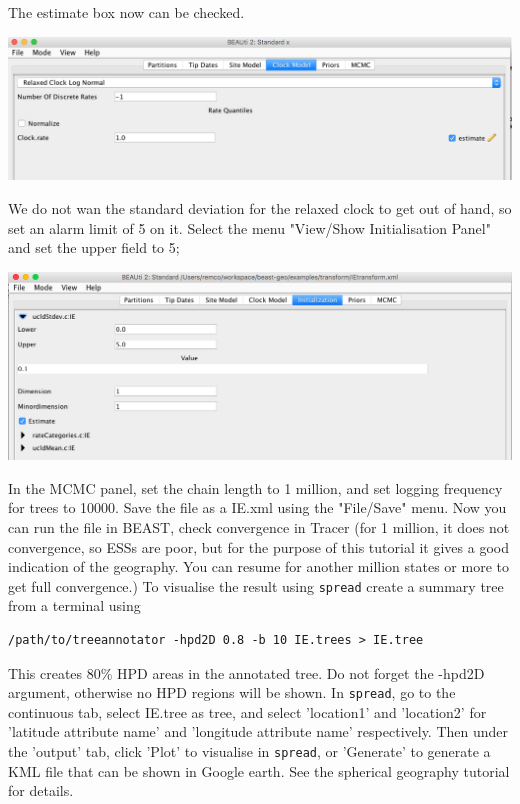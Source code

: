 \documentclass{article}
\begin{document}
The estimate box now can be checked.

\begin{center}
\includegraphics[scale=0.4]{figures/BEAUti_transform6}
\end{center}

We do not wan the standard deviation for the relaxed clock to get out of hand, so set an alarm limit of 5 on it. Select the menu "View/Show Initialisation Panel" and set the upper field to 5;

\begin{center}
\includegraphics[scale=0.4]{figures/BEAUti_transform7} 
\end{center}

In the MCMC panel, set the chain length to 1 million, and set logging frequency for trees to 10000. Save the file as a IE.xml using the "File/Save" menu. Now you can run the file in BEAST, check convergence in Tracer (for 1 million, it does not convergence, so ESSs are poor, but for the purpose of this tutorial it gives a good indication of the geography. You can resume for another million states or more to get full convergence.) To visualise the result using {\tt spread} create a summary tree from a terminal using
\begin{verbatim}
/path/to/treeannotator -hpd2D 0.8 -b 10 IE.trees > IE.tree
\end{verbatim}
This creates 80\% HPD areas in the annotated tree. Do not forget the -hpd2D argument, otherwise no HPD regions will be shown. 
In {\tt spread}, go to the continuous tab, select IE.tree as tree, and select 'location1' and 'location2' for 'latitude attribute name' and 'longitude attribute name' respectively. Then under the 'output' tab, click 'Plot' to visualise in {\tt spread}, or 'Generate' to generate a KML file that can be shown in Google earth. See the spherical geography tutorial for details.
\end{document}
